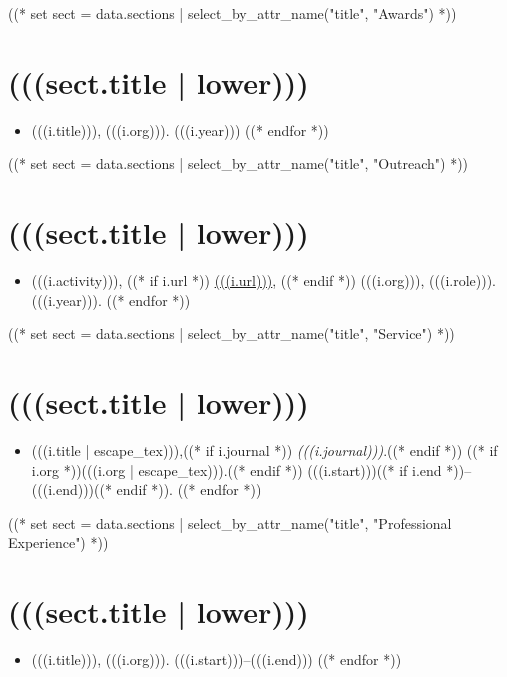 \documentclass[11pt,article,oneside]{memoir}
\begin{document}
((* set sect = data.sections | select_by_attr_name("title", "Awards") *))
\section{(((sect.title | lower)))}

\mbox{}\vspace{-\dimexpr\baselineskip\relax}

\begin{itemize}[label={}]
((* for i in sect.entries.awards | sort_by_attr(["year"], reverse=True) *))
\item (((i.title))), (((i.org))). (((i.year)))
((* endfor *))
\end{itemize}

((* set sect = data.sections | select_by_attr_name("title", "Outreach") *))
\section{(((sect.title | lower)))}

\mbox{}\vspace{-\dimexpr\baselineskip\relax}

\begin{itemize}[label={}]
((* for i in sect.entries.outreach | sort_last_year("year", reverse=True) *))
\item (((i.activity))), ((* if i.url *)) \url{(((i.url)))}, ((* endif *)) (((i.org))),  (((i.role))). (((i.year))).
((* endfor *))
\end{itemize}

((* set sect = data.sections | select_by_attr_name("title", "Service") *))
\section{(((sect.title | lower)))}

\mbox{}\vspace{-\dimexpr\baselineskip\relax}

\begin{itemize}[label={}]
((* for i in sect.entries.service *))
\item (((i.title | escape_tex))),((* if i.journal *)) \emph{(((i.journal)))}.((* endif *)) ((* if i.org *))(((i.org | escape_tex))).((* endif *)) (((i.start)))((* if i.end *))--(((i.end)))((* endif *)).
((* endfor *))
\end{itemize}

((* set sect = data.sections | select_by_attr_name("title", "Professional Experience") *))
\section{(((sect.title | lower)))}

\mbox{}\vspace{-\dimexpr\baselineskip\relax}

\begin{itemize}[label={}]
((* for i in sect.entries.experience | sort_by_attr(["end", "start"], reverse=True) *))
\item (((i.title))), (((i.org))). (((i.start)))--(((i.end)))
((* endfor *))
\end{itemize}
\end{document}

